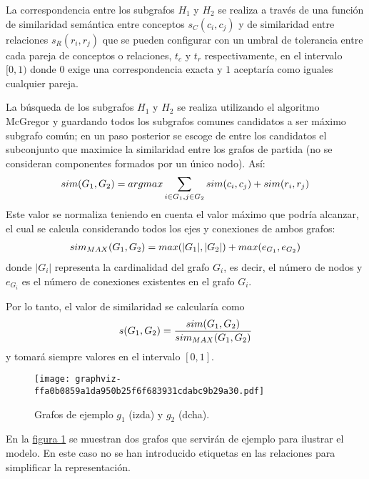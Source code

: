 \documentclass[a4paper,12pt,spanish]{book}
\begin{document}
La correspondencia entre los subgrafos \(H_1\) y \(H_2\) se realiza a través de una
función de similaridad semántica entre conceptos \(s_C(c_i, c_j)\) y de similaridad entre
relaciones \(s_R(r_i, r_j)\) que se pueden configurar con un umbral de tolerancia entre
cada pareja de conceptos o relaciones, \(t_c\) y \(t_r\) respectivamente, en el
intervalo \([0, 1)\) donde \(0\) exige una correspondencia exacta y \(1\)
aceptaría como iguales cualquier pareja.

La búsqueda de los subgrafos \(H_1\) y \(H_2\) se realiza utilizando el algoritmo
McGregor y guardando todos los subgrafos comunes candidatos a ser máximo subgrafo común;
en un paso posterior se escoge de entre los candidatos el subconjunto que maximice la
similaridad entre los grafos de partida (no se consideran componentes formados por
un único nodo). Así:
\begin{gather}
\begin{split}sim(G_1, G_2) = argmax \sum_{i \in G_1, j \in G_2} sim(c_i, c_j) + sim(r_i, r_j)\end{split}\notag
\end{gather}
Este valor se normaliza teniendo en cuenta el valor máximo que podría alcanzar, el cual
se calcula considerando todos los ejes y conexiones de ambos grafos:
\begin{gather}
\begin{split}sim_{MAX}(G_1, G_2) = max(|G_1|, |G_2|) + max(e_{G_1}, e_{G_2})\end{split}\notag
\end{gather}
donde \(|G_i|\) representa la cardinalidad del grafo \(G_i\), es decir, el
número de nodos y \(e_{G_i}\) es el número de conexiones existentes en el
grafo \(G_i\).

Por lo tanto, el valor de similaridad se calcularía como
\begin{gather}
\begin{split}s(G_1, G_2) = \frac{sim(G_1, G_2)}{sim_{MAX}(G_1, G_2)}\end{split}\notag
\end{gather}
y tomará siempre valores en el intervalo \([0, 1]\).
\begin{figure}[htbp]
\centering
\capstart

\texttt{[image: graphviz-ffa0b0859a1da950b25f6f683931cdabc9b29a30.pdf]}
\caption{Grafos de ejemplo \(g_1\) (izda) y \(g_2\) (dcha).}\label{4.model/ii.modelo:fig-model-example-graph}\end{figure}

En la \hyperref[4.model/ii.modelo:fig-model-example-graph]{figura  \ref*{4.model/ii.modelo:fig-model-example-graph}} se muestran dos grafos que servirán de
ejemplo para ilustrar el modelo. En este caso no se han introducido etiquetas en las
relaciones para simplificar la representación.
\end{document}
